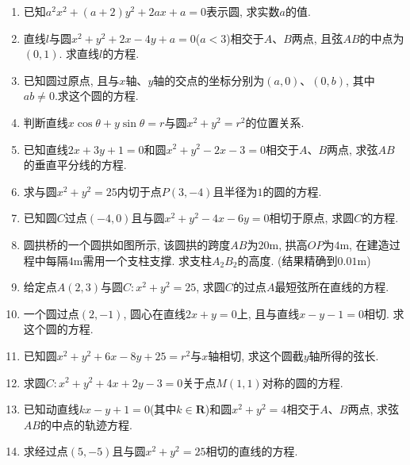\documentclass[10pt,a4paper]{article}
\begin{document}
\begin{enumerate}[1.]
\item 已知$a^2x^2+(a+2)y^2+2ax+a=0$表示圆, 求实数$a$的值.
\item 直线$l$与圆$x^2+y^2+2x-4y+a=0$($a<3$)相交于$A$、$B$两点, 且弦$AB$的中点为$(0, 1)$. 求直线$l$的方程.
\item 已知圆过原点, 且与$x$轴、$y$轴的交点的坐标分别为$(a, 0)$、$(0, b)$, 其中$ab\ne 0$.求这个圆的方程.
\item 判断直线$x\cos \theta +y\sin \theta =r$与圆$x^2+y^2=r^2$的位置关系.
\item 已知直线$2x+3y+1=0$和圆$x^2+y^2-2x-3=0$相交于$A$、$B$两点, 求弦$AB$的垂直平分线的方程.
\item 求与圆$x^2+y^2=25$内切于点$P(3, -4)$且半径为$1$的圆的方程.
\item 已知圆$C$过点$(-4, 0)$且与圆$x^2+y^2-4x-6y=0$相切于原点, 求圆$C$的方程.
\item 圆拱桥的一个圆拱如图所示, 该圆拱的跨度$AB$为$20\text{m}$, 拱高$OP$为$4\text{m}$, 在建造过程中每隔$4\text{m}$需用一个支柱支撑. 求支柱$A_2B_2$的高度. (结果精确到$0.01\text{m}$)
\begin{center}
\end{center}
\item 给定点$A(2, 3)$与圆$C: x^2+y^2=25$, 求圆$C$的过点$A$最短弦所在直线的方程.
\item 一个圆过点$(2, -1)$, 圆心在直线$2x+y=0$上, 且与直线$x-y-1=0$相切. 求这个圆的方程.
\item 已知圆$x^2+y^2+6x-8y+25=r^2$与$x$轴相切, 求这个圆截$y$轴所得的弦长.
\item 求圆$C: x^2+y^2+4x+2y-3=0$关于点$M(1, 1)$对称的圆的方程.
\item 已知动直线$kx-y+1=0$(其中$k\in \mathbf{R}$)和圆$x^2+y^2=4$相交于$A$、$B$两点, 求弦$AB$的中点的轨迹方程.
\item 求经过点$(5, -5)$且与圆$x^2+y^2=25$相切的直线的方程.

\end{enumerate}
\end{document}
